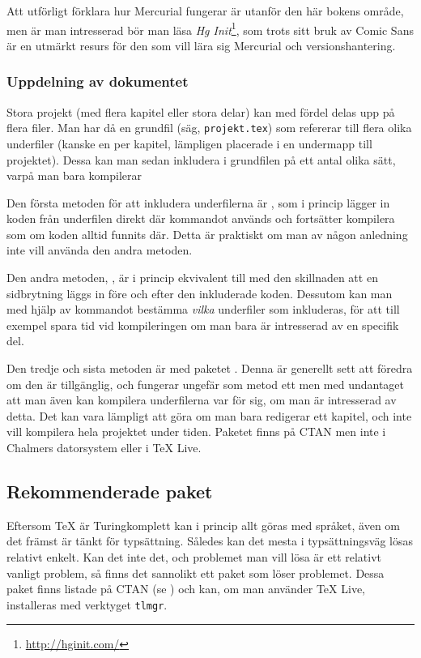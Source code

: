 \documentclass[lang=sv,ptsize=10pt,font=none,nomath,titles=bf,../../a4.tex]{subfiles}
\begin{document}
Att utförligt förklara hur Mercurial fungerar är utanför den här bokens
område, men är man intresserad bör man läsa
\emph{Hg Init}\footnote{\url{http://hginit.com/}}, som trots sitt bruk av
Comic Sans är en utmärkt resurs för den som vill lära sig Mercurial och
versionshantering.

\subsubsection{Uppdelning av dokumentet}
Stora projekt (med flera kapitel eller stora delar) kan med fördel delas
upp på flera filer. Man har då en grundfil (säg, \texttt{projekt.tex}) som
refererar till flera olika underfiler (kanske en per kapitel, lämpligen
placerade i en undermapp till projektet). Dessa kan man sedan inkludera
i grundfilen på ett antal olika sätt, varpå man bara kompilerar

Den första metoden för att inkludera underfilerna är , som i
princip lägger in koden från underfilen direkt där kommandot används och
fortsätter kompilera som om koden alltid funnits där. Detta är praktiskt
om man av någon anledning inte vill använda den andra metoden.

Den andra metoden, , är i princip ekvivalent till 
med den skillnaden att en sidbrytning läggs in före och efter den 
inkluderade koden. Dessutom kan man med hjälp av kommandot
 bestämma \emph{vilka} underfiler som inkluderas, för att
till exempel spara tid vid kompileringen om man bara är intresserad av en
specifik del.

Den tredje och sista metoden är med paketet . Denna är
generellt sett att föredra om den är tillgänglig, och fungerar ungefär som
metod ett men med undantaget att man även kan kompilera underfilerna
var för sig, om man är intresserad av detta. Det kan vara lämpligt att
göra om man bara redigerar ett kapitel, och inte vill kompilera hela
projektet under tiden. Paketet  finns på CTAN men inte i
Chalmers datorsystem eller i \TeX{} Live.

\subsection{Rekommenderade paket}
Eftersom \TeX{} är Turingkomplett kan i princip allt göras med språket,
även om det främst är tänkt för typsättning. Således kan det mesta i 
typsättningsväg lösas relativt enkelt. Kan det inte det, och problemet
man vill lösa är ett relativt vanligt problem, så finns det sannolikt ett
paket som löser problemet. Dessa paket finns listade på CTAN (se
) och kan, om man använder \TeX{} Live, installeras
med verktyget \texttt{tlmgr}.
\end{document}
